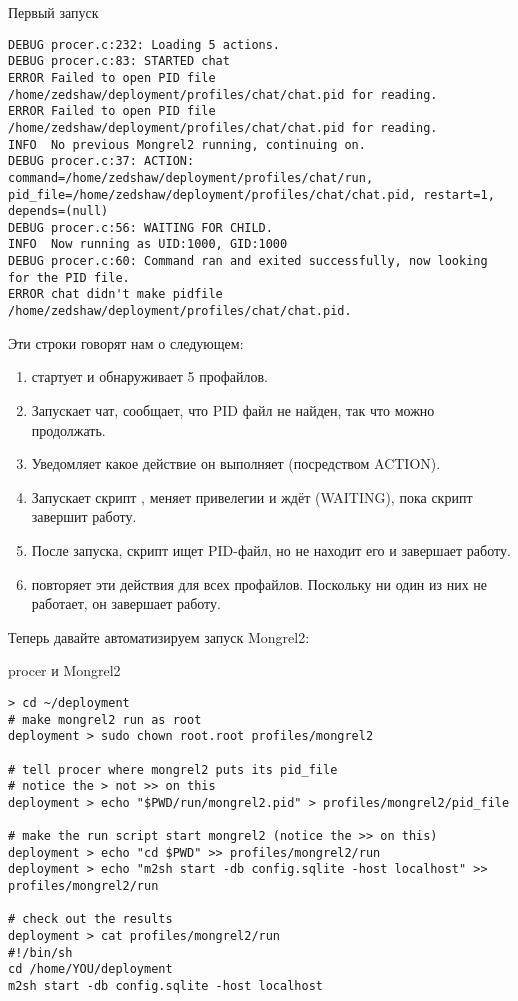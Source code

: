 \begin{code}{Первый запуск}
\begin{lstlisting}
DEBUG procer.c:232: Loading 5 actions.
DEBUG procer.c:83: STARTED chat
ERROR Failed to open PID file /home/zedshaw/deployment/profiles/chat/chat.pid for reading.
ERROR Failed to open PID file /home/zedshaw/deployment/profiles/chat/chat.pid for reading.
INFO  No previous Mongrel2 running, continuing on.
DEBUG procer.c:37: ACTION: command=/home/zedshaw/deployment/profiles/chat/run, pid_file=/home/zedshaw/deployment/profiles/chat/chat.pid, restart=1, depends=(null)
DEBUG procer.c:56: WAITING FOR CHILD.
INFO  Now running as UID:1000, GID:1000
DEBUG procer.c:60: Command ran and exited successfully, now looking for the PID file.
ERROR chat didn't make pidfile /home/zedshaw/deployment/profiles/chat/chat.pid.
\end{lstlisting}
\end{code}

Эти строки говорят нам о следующем:

\begin{enumerate}
\item {} стартует и обнаруживает 5 профайлов.
\item Запускает чат, сообщает, что PID файл не найден, так что можно продолжать.
\item Уведомляет какое действие он выполняет (посредством ACTION).
\item Запускает скрипт , меняет привелегии и ждёт (WAITING), пока
    скрипт завершит работу.
\item После запуска, скрипт ищет PID-файл, но не находит его и завершает работу.
\item {} повторяет эти действия для всех профайлов. Поскольку ни один из них не
работает, он завершает работу.
\end{enumerate}

Теперь давайте автоматизируем запуск Mongrel2:

\begin{code}{procer и Mongrel2}
\begin{lstlisting}
> cd ~/deployment
# make mongrel2 run as root
deployment > sudo chown root.root profiles/mongrel2

# tell procer where mongrel2 puts its pid_file
# notice the > not >> on this
deployment > echo "$PWD/run/mongrel2.pid" > profiles/mongrel2/pid_file

# make the run script start mongrel2 (notice the >> on this)
deployment > echo "cd $PWD" >> profiles/mongrel2/run
deployment > echo "m2sh start -db config.sqlite -host localhost" >> profiles/mongrel2/run

# check out the results
deployment > cat profiles/mongrel2/run
#!/bin/sh
cd /home/YOU/deployment
m2sh start -db config.sqlite -host localhost
\end{lstlisting}
\end{code}

